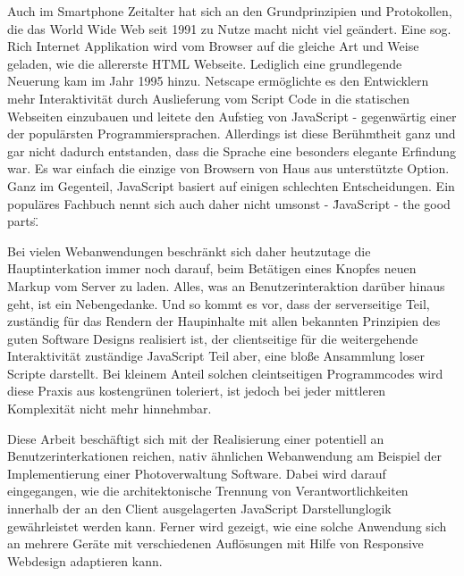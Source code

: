 Auch im Smartphone Zeitalter hat sich an den Grundprinzipien und
Protokollen, die das World Wide Web seit 1991 zu Nutze macht nicht viel geändert.
Eine sog. Rich Internet Applikation wird vom Browser auf die gleiche Art und
Weise geladen, wie die allererste HTML Webseite. Lediglich eine grundlegende
Neuerung kam im Jahr 1995 hinzu. Netscape ermöglichte es den Entwicklern mehr
Interaktivität durch Auslieferung vom Script Code in die statischen Webseiten
einzubauen und leitete den Aufstieg von JavaScript - gegenwärtig einer der populärsten
Programmiersprachen. Allerdings ist diese Berühmtheit ganz und gar nicht
dadurch entstanden, dass die Sprache eine besonders elegante Erfindung war. Es
war einfach die einzige von Browsern von Haus aus unterstützte Option. Ganz
im Gegenteil, JavaScript basiert auf einigen schlechten Entscheidungen. Ein
populäres Fachbuch nennt sich auch daher nicht umsonst - \"JavaScript - the good
parts\".  


Bei vielen Webanwendungen beschränkt sich daher heutzutage die Hauptinterkation
immer noch darauf, beim Betätigen eines Knopfes neuen Markup vom Server zu laden. Alles, was an
Benutzerinteraktion darüber hinaus geht, ist ein Nebengedanke. Und so kommt es
vor, dass der serverseitige Teil, zuständig für das Rendern der Haupinhalte mit
allen bekannten Prinzipien des guten Software Designs realisiert ist, der
clientseitige für die weitergehende Interaktivität zuständige JavaScript Teil aber,
eine bloße Ansammlung loser Scripte darstellt. Bei kleinem Anteil solchen
cleintseitigen Programmcodes wird diese Praxis aus kostengrünen toleriert, ist
jedoch bei jeder mittleren Komplexität nicht mehr hinnehmbar.

Diese Arbeit beschäftigt sich mit der Realisierung einer potentiell an
Benutzerinterkationen reichen, nativ ähnlichen Webanwendung am Beispiel der
Implementierung einer Photoverwaltung Software. Dabei wird darauf eingegangen,
wie die architektonische Trennung von Verantwortlichkeiten innerhalb der an den
Client ausgelagerten JavaScript Darstellunglogik gewährleistet werden kann.
Ferner wird gezeigt, wie eine solche Anwendung sich an mehrere Geräte mit verschiedenen
Auflösungen mit Hilfe von Responsive Webdesign adaptieren kann.

